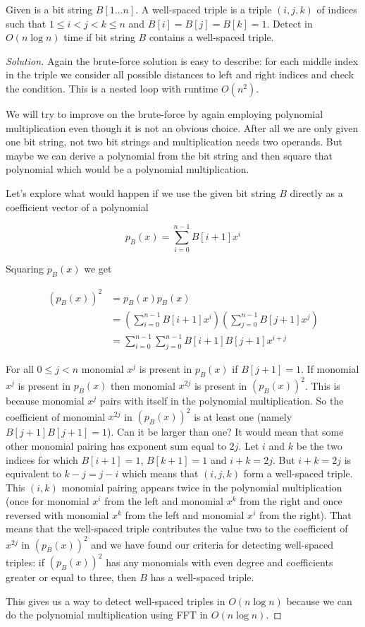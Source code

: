 \vspace{10 mm}

\begin{problem}
Given is a bit string $B[1 \ldots n]$. A well-spaced triple is a triple $(i, j, k)$ of indices such that $1 \leq i < j < k \leq n$ and $B[i] = B[j] = B[k] = 1$. Detect in $O(n \log n)$ time if bit string $B$ contains a well-spaced triple.
\end{problem}

\begin{proof}[Solution]
Again the brute-force solution is easy to describe: for each middle index in the triple we consider all possible distances to left and right indices and check the condition. This is a nested loop with runtime $O(n^2)$.

We will try to improve on the brute-force by again employing polynomial multiplication even though it is not an obvious choice. After all we are only given one bit string, not two bit strings and multiplication needs two operands. But maybe we can derive a polynomial from the bit string and then square that polynomial which would be a polynomial multiplication.

Let's explore what would happen if we use the given bit string $B$ directly as a coefficient vector of a polynomial

$$
p_B(x) = \sum_{i = 0}^{n-1} B[i + 1] x^i
$$

Squaring $p_B(x)$ we get

\begin{align*}
(p_B(x))^2 &= p_B(x) p_B(x) \\
           &= (\sum_{i = 0}^{n-1} B[i + 1] x^i) (\sum_{j = 0}^{n-1} B[j + 1] x^j) \\
           &= \sum_{i = 0}^{n-1} \sum_{j = 0}^{n-1} B[i + 1] B[j + 1] x^{i + j}
\end{align*}

For all $0 \leq j < n$ monomial $x^j$ is present in $p_B(x)$ if $B[j+1] = 1$. If monomial $x^j$ is present in $p_B(x)$ then monomial $x^{2 j}$ is present in $(p_B(x))^2$. This is because monomial $x^j$ pairs with itself in the polynomial multiplication. So the coefficient of monomial $x^{2 j}$ in $(p_B(x))^2$ is at least one (namely $B[j + 1] B[j + 1] = 1$). Can it be larger than one? It would mean that some other monomial pairing has exponent sum equal to $2 j$. Let $i$ and $k$ be the two indices for which $B[i + 1] = 1$, $B[k + 1] = 1$ and $i + k = 2 j$. But $i + k = 2 j$ is equivalent to $k - j = j - i$ which means that $(i, j, k)$ form a well-spaced triple. This $(i, k)$ monomial pairing appears twice in the polynomial multiplication (once for monomial $x^i$ from the left and monomial $x^k$ from the right and once reversed with monomial $x^k$ from the left and monomial $x^i$ from the right). That means that the well-spaced triple contributes the value two to the coefficient of $x^{2 j}$ in $(p_B(x))^2$ and we have found our criteria for detecting well-spaced triples: if $(p_B(x))^2$ has any monomials with even degree and coefficients greater or equal to three, then $B$ has a well-spaced triple.

This gives us a way to detect well-spaced triples in $O(n \log n)$ because we can do the polynomial multiplication using FFT in $O(n \log n)$.

\end{proof}
